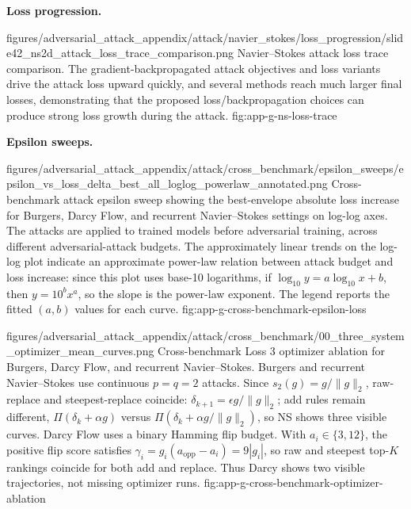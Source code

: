 \documentclass[letterpaper]{article} %
\newcounter{appendixsection}
\newcounter{appendixsubsection}[appendixsection]
\newcounter{appendixdomain}[appendixsubsection]
\begin{document}
\noindent\textbf{Loss progression.}

\appendixattackfig
  {figures/adversarial_attack_appendix/attack/navier_stokes/loss_progression/slide42_ns2d_attack_loss_trace_comparison.png}
  {Navier--Stokes attack loss trace comparison. The gradient-backpropagated
  attack objectives and loss variants drive the attack loss upward quickly, and
  several methods reach much larger final losses, demonstrating that the
  proposed loss/backpropagation choices can produce strong loss growth during
  the attack.}
  {fig:app-g-ns-loss-trace}

\FloatBarrier
{}

\noindent\textbf{Epsilon sweeps.}

\appendixattackfig
  {figures/adversarial_attack_appendix/attack/cross_benchmark/epsilon_sweeps/epsilon_vs_loss_delta_best_all_loglog_powerlaw_annotated.png}
  {Cross-benchmark attack epsilon sweep showing the best-envelope absolute
  loss increase for Burgers, Darcy Flow, and recurrent Navier--Stokes settings
  on log-log axes. The attacks are applied to trained models before
  adversarial training, across different adversarial-attack budgets. The
  approximately linear trends on the log-log plot indicate an approximate
  power-law relation between attack budget and loss increase: since this plot
  uses base-10 logarithms, if $\log_{10} y = a\log_{10} x + b$, then
  $y = 10^b x^a$, so the slope is the power-law exponent. The legend reports
  the fitted $(a,b)$ values for each curve.}
  {fig:app-g-cross-benchmark-epsilon-loss}

\appendixattackfig
  {figures/adversarial_attack_appendix/attack/cross_benchmark/00_three_system_optimizer_mean_curves.png}
  {Cross-benchmark Loss 3 optimizer ablation for Burgers, Darcy Flow, and
  recurrent Navier--Stokes. Burgers and recurrent Navier--Stokes use continuous
  \(p=q=2\) attacks. Since \(s_2(g)=g/\|g\|_2\),
  raw-replace and steepest-replace coincide:
  \(\delta_{k+1}=\epsilon g/\|g\|_2\); add rules remain different,
  \(\Pi(\delta_k+\alpha g)\) versus
  \(\Pi(\delta_k+\alpha g/\|g\|_2)\), so NS shows three visible curves. Darcy
  Flow uses a binary Hamming flip budget. With \(a_i\in\{3,12\}\),
  the positive flip score satisfies
  \(\gamma_i=g_i(a_{\mathrm{opp}}-a_i)=9|g_i|\), so raw and steepest top-\(K\)
  rankings coincide for both add and replace. Thus Darcy shows two visible
  trajectories, not missing optimizer runs.}
  {fig:app-g-cross-benchmark-optimizer-ablation}
\end{document}
